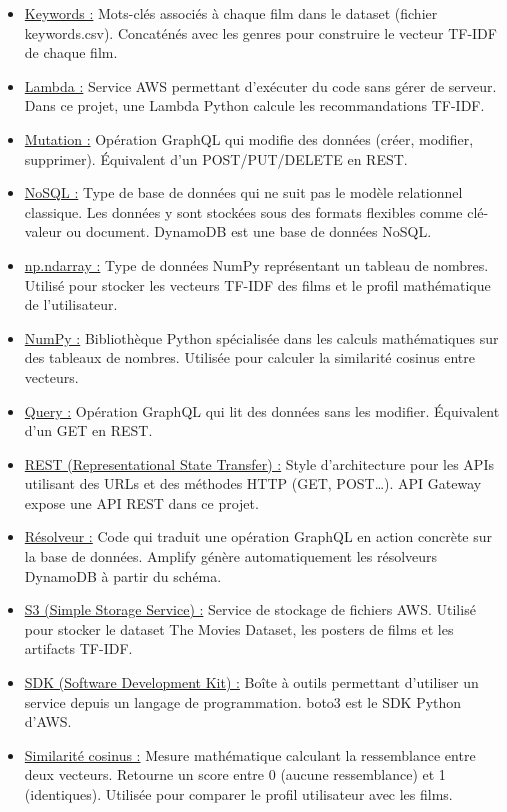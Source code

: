 \documentclass[a4paper,12pt]{report}
\begin{document}
\begin{itemize}
    \item \underline{Keywords :} Mots-clés associés à chaque film dans le dataset (fichier keywords.csv). Concaténés avec les genres pour construire le vecteur TF-IDF de chaque film.
    \item \underline{Lambda :} Service AWS permettant d’exécuter du code sans gérer de serveur. Dans ce projet, une Lambda Python calcule les recommandations TF-IDF.
    \item \underline{Mutation :} Opération GraphQL qui modifie des données (créer, modifier, supprimer). Équivalent d’un POST/PUT/DELETE en REST.
    \item \underline{NoSQL :} Type de base de données qui ne suit pas le modèle relationnel classique. Les données y sont stockées sous des formats flexibles comme clé-valeur ou document. DynamoDB est une base de données NoSQL.
    \item \underline{np.ndarray :} Type de données NumPy représentant un tableau de nombres. Utilisé pour stocker les vecteurs TF-IDF des films et le profil mathématique de l’utilisateur.
    \item \underline{NumPy :} Bibliothèque Python spécialisée dans les calculs mathématiques sur des tableaux de nombres. Utilisée pour calculer la similarité cosinus entre vecteurs.
    \item \underline{Query :} Opération GraphQL qui lit des données sans les modifier. Équivalent d’un GET en REST.
    \item \underline{REST (Representational State Transfer) :} Style d’architecture pour les APIs utilisant des URLs et des méthodes HTTP (GET, POST…). API Gateway expose une API REST dans ce projet.
    \item \underline{Résolveur :} Code qui traduit une opération GraphQL en action concrète sur la base de données. Amplify génère automatiquement les résolveurs DynamoDB à partir du schéma.
    \item \underline{S3 (Simple Storage Service) :} Service de stockage de fichiers AWS. Utilisé pour stocker le dataset The Movies Dataset, les posters de films et les artifacts TF-IDF.
    \item \underline{SDK (Software Development Kit) :} Boîte à outils permettant d’utiliser un service depuis un langage de programmation. boto3 est le SDK Python d’AWS.
    \item \underline{Similarité cosinus :} Mesure mathématique calculant la ressemblance entre deux vecteurs. Retourne un score entre 0 (aucune ressemblance) et 1 (identiques). Utilisée pour comparer le profil utilisateur avec les films.

\end{itemize}
\end{document}
